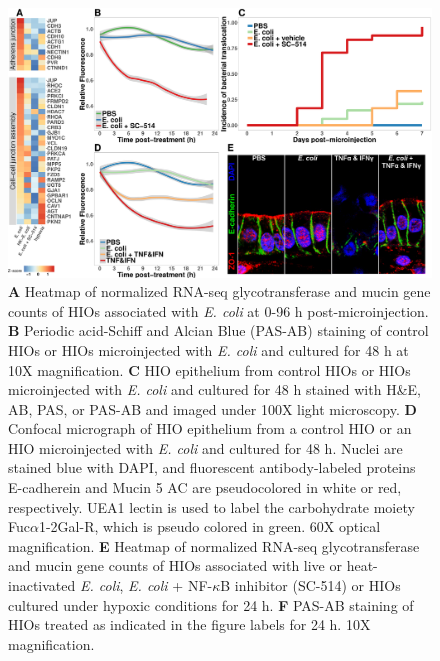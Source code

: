 \documentclass[9pt,lineo]{elife}
\begin{document}
\begin{figure}
\begin{fullwidth}
\centering
\includegraphics[width=0.9\linewidth]{./figures/figure7/figure7_multipanel.pdf}
\caption{\textbf{A} Heatmap of normalized RNA-seq glycotransferase and mucin gene counts of HIOs associated with \textit{E. coli} at 0-96 h post-microinjection. \textbf{B} Periodic acid-Schiff and Alcian Blue (PAS-AB) staining of control HIOs or HIOs microinjected with \textit{E. coli} and cultured for 48 h at 10X magnification. \textbf{C} HIO epithelium from control HIOs or HIOs microinjected with \textit{E. coli} and cultured for 48 h stained with H\&E, AB, PAS, or PAS-AB and imaged under 100X light microscopy. \textbf{D} Confocal micrograph of HIO epithelium from a control HIO or an HIO microinjected with \textit{E. coli} and cultured for 48 h. Nuclei are stained blue with DAPI, and fluorescent antibody-labeled proteins E-cadherein and Mucin 5 AC are pseudocolored in white or red, respectively. UEA1 lectin is used to label the carbohydrate moiety Fuc$\alpha$1-2Gal-R, which is pseudo colored in green. 60X optical magnification. \textbf{E} Heatmap of normalized RNA-seq glycotransferase and mucin gene counts of HIOs associated with live or heat-inactivated \textit{E. coli}, \textit{E. coli} + NF-$\kappa$B inhibitor (SC-514) or HIOs cultured under hypoxic conditions for 24 h. \textbf{F} PAS-AB staining of HIOs treated as indicated in the figure labels for 24 h. 10X magnification.}
\label{fig:fullwidth}
\end{fullwidth}
\end{figure}
\end{document}
